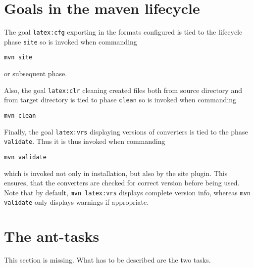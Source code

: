 \section{Goals in the maven lifecycle}\label{sec:usageLifecycle}

The goal \texttt{latex:cfg} exporting in the formats configured
is tied to the lifecycle phase \texttt{site} so is invoked
when commanding
%
\begin{Verbatim}[fontsize=\scriptsize]
mvn site
\end{Verbatim}
%
or subsequent phase.

Also, the goal \texttt{latex:clr} cleaning created files
both from source directory and from target directory
is tied to phase \texttt{clean} so is invoked
when commanding
%
\begin{Verbatim}[fontsize=\scriptsize]
mvn clean
\end{Verbatim}

Finally, the goal \texttt{latex:vrs} displaying versions of converters
is tied to the phase \texttt{validate}. 
Thus it is thus invoked when commanding
%
\begin{Verbatim}[fontsize=\scriptsize]
mvn validate
\end{Verbatim}
%
which is invoked not only in installation, but also by the site plugin.
This ensures, that the converters are checked for correct version
before being used. 
Note that by default, \texttt{mvn latex:vrs} displays complete version info,
whereas \texttt{mvn validate} only displays warnings if appropriate. 




\section{The ant-tasks}\label{sec:usageAntTask}

This section is missing.
What has to be described are the two tasks. 
